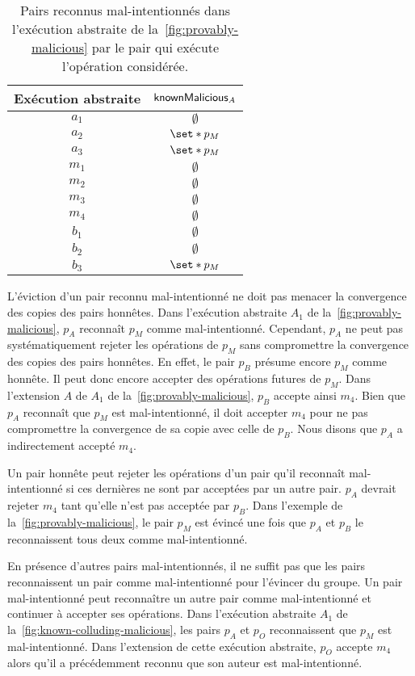 \begin{table}[htb]
    \centering
    \begin{tabular}{c|c}
        Exécution abstraite & $\operatorname{\mathsf{knownMalicious}}_A$ \\
        \hline
        $a_1$ & $\emptyset$ \\
        $a_2$ & $\set*{p_M}$ \\
        $a_3$ & $\set*{p_M}$ \\
        $m_1$ & $\emptyset$ \\
        $m_2$ & $\emptyset$ \\
        $m_3$ & $\emptyset$ \\
        $m_4$ & $\emptyset$ \\
        $b_1$ & $\emptyset$ \\
        $b_2$ & $\emptyset$ \\
        $b_3$ & $\set*{p_M}$ \\
    \end{tabular}
    \caption{Pairs reconnus mal-intentionnés dans l'exécution abstraite de la~\autoref{fig:provably-malicious} par le pair qui exécute l'opération considérée.}\label{tab:known-malicious}
\end{table}

L'éviction d'un pair reconnu mal-intentionné ne doit pas menacer la convergence des copies des pairs honnêtes.
Dans l'exécution abstraite $A_1$ de la~\autoref{fig:provably-malicious}, $p_A$ reconnaît $p_M$ comme mal-intentionné.
Cependant, $p_A$ ne peut pas systématiquement rejeter les opérations de $p_M$ sans compromettre la convergence des copies des pairs honnêtes.
En effet, le pair $p_B$ présume encore $p_M$ comme honnête.
Il peut donc encore accepter des opérations futures de $p_M$.
Dans l'extension $A$ de $A_1$ de la~\autoref{fig:provably-malicious}, $p_B$ accepte ainsi $m_4$.
Bien que $p_A$ reconnaît que $p_M$ est mal-intentionné, il doit accepter $m_4$ pour ne pas compromettre la convergence de sa copie avec celle de $p_B$.
Nous disons que $p_A$ a indirectement accepté $m_4$.

Un pair honnête peut rejeter les opérations d'un pair qu'il reconnaît mal-intentionné si ces dernières ne sont par acceptées par un autre pair.
$p_A$ devrait rejeter $m_4$ tant qu'elle n'est pas acceptée par $p_B$.
Dans l'exemple de la~\autoref{fig:provably-malicious}, le pair $p_M$ est évincé une fois que $p_A$ et $p_B$ le reconnaissent tous deux comme mal-intentionné.

En présence d'autres pairs mal-intentionnés, il ne suffit pas que les pairs reconnaissent un pair comme mal-intentionné pour l'évincer du groupe.
Un pair mal-intentionné peut reconnaître un autre pair comme mal-intentionné et continuer à accepter ses opérations.
Dans l'exécution abstraite $A_1$ de la~\autoref{fig:known-colluding-malicious}, les pairs $p_A$ et $p_O$ reconnaissent que $p_M$ est mal-intentionné.
Dans l'extension de cette exécution abstraite, $p_O$ accepte $m_4$ alors qu'il a précédemment reconnu que son auteur est mal-intentionné.

